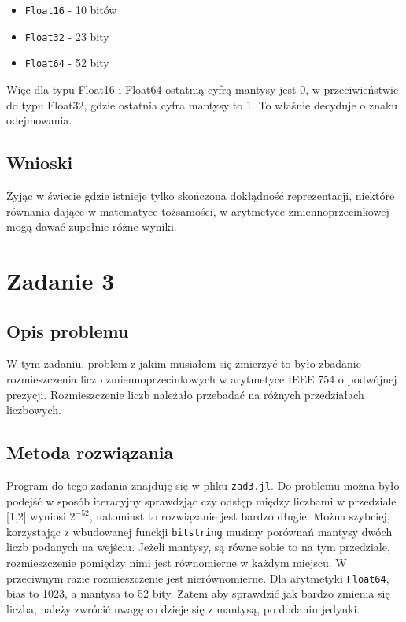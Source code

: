 \documentclass{article}
\begin{document}
\begin{itemize}
    \item \texttt{Float16} - 10 bitów
    \item \texttt{Float32} - 23 bity
    \item \texttt{Float64} - 52 bity
\end{itemize}

Więc dla typu Float16 i Float64 ostatnią cyfrą mantysy jest 0, w przeciwieństwie do typu Float32, gdzie ostatnia cyfra mantysy to 1. To właśnie decyduje o znaku odejmowania.

\subsection{Wnioski}

Żyjąc w świecie gdzie istnieje tylko skończona dokłądność reprezentacji, niektóre równania dające w matematyce tożsamości, w arytmetyce zmiennoprzecinkowej mogą dawać zupełnie różne wyniki.



\section{Zadanie 3}

\subsection{Opis problemu}

W tym zadaniu, problem z jakim musiałem się zmierzyć to było zbadanie rozmieszczenia liczb zmiennoprzecinkowych w arytmetyce IEEE 754 o podwójnej prezycji. Rozmieszczenie liczb należało przebadać na różnych przedziałach liczbowych.

\subsection{Metoda rozwiązania}

Program do tego zadania znajduję się w pliku \texttt{zad3.jl}. Do problemu można było podejść w sposób iteracyjny sprawdzjąc czy odstęp między liczbami w przedziale [1,2] wyniosi \(2^{-52}\), natomiast to rozwiązanie jest bardzo długie. Można szybciej, korzystając z wbudowanej funckji \texttt{bitstring} musimy porównań mantysy dwóch liczb podanych na wejściu. Jeżeli mantysy, są równe sobie to na tym przedziale, rozmieszczenie pomiędzy nimi jest równomierne w każdym miejscu. W przeciwnym razie rozmieszczenie jest nierównomierne. Dla arytmetyki \texttt{Float64}, bias to 1023, a mantysa to 52 bity. Zatem aby sprawdzić jak bardzo zmienia się liczba, należy zwrócić uwagę co dzieje się z mantysą, po dodaniu jedynki.
\end{document}
